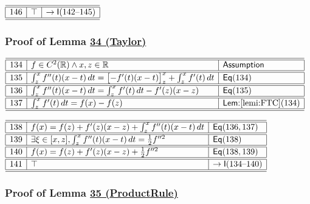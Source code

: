 \documentclass[11pt,reqno]{amsart}
\begin{document}
\medskip

\noindent$%
\begin{array}{|r|l|l|}
\hline\hline
146 & \top & \to\mathsf{I}(142\text{--}145) \\ \hline\hline
\end{array}%
$

\medskip

\subsubsection*{Proof of Lemma \hyperlink{lem:Taylor}{34 (\textsf{Taylor})}}

\noindent$%
\begin{array}{|r|l|l|}
\hline\hline
134 & f\in C^{2}(\mathbb{R})\wedge x,z\in\mathbb{R} & \textsf{Assumption} \\ \hline\hline
135 & \int_{z}^{x}f^{\prime \prime }(t)(x-t)\,dt=\bigl[-f^{\prime }(t)(x-t)\bigr]_{z}^{x}+\int_{z}^{x}f^{\prime }(t)\,dt & \mathsf{Eq}(134) \\ \hline\hline
136 & \int_{z}^{x}f^{\prime \prime }(t)(x-t)\,dt=\int_{z}^{x}f^{\prime }(t)\,dt-f^{\prime }(z)(x-z) & \mathsf{Eq}(135) \\ \hline\hline
137 & \int_{z}^{x}f^{\prime }(t)\,dt=f(x)-f(z) & \textsf{Lem:}\ref{lemi:FTC}(134) \\ \hline\hline
\end{array}%
$

\medskip

\noindent$%
\begin{array}{|r|l|l|}
\hline\hline
138 & f(x)=f(z)+f^{\prime }(z)(x-z)+\int_{z}^{x}f^{\prime \prime }(t)(x-t)\,dt & \mathsf{Eq}(136,137) \\ \hline\hline
139 & \exists\xi\in[x,z],\int_{z}^{x}f^{\prime \prime }(t)(x-t)\,dt=\tfrac{1}{2}f^{\prime \prime 2} & \mathsf{Eq}(138) \\ \hline\hline
140 & f(x)=f(z)+f^{\prime }(z)(x-z)+\tfrac{1}{2}f^{\prime \prime 2} & \mathsf{Eq}(138,139) \\ \hline\hline
141 & \top & \to\mathsf{I}(134\text{--}140) \\ \hline\hline
\end{array}%
$

\medskip

\subsubsection*{Proof of Lemma \hyperlink{lem:ProductRule}{35 (\textsf{ProductRule})}}
\end{document}
